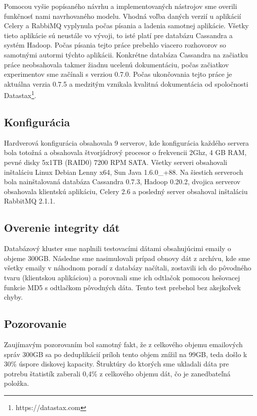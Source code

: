 \documentclass[11pt,twoside,a4paper]{book}
\begin{document}
Pomocou vyšie popísaného návrhu a implementovaných nástrojov sme overili funkčnosť nami navrhovaného modelu. Vhodná voľba daných verzií u aplikácií Celery a RabbiMQ vyplynula počas písania a ladenia samotnej aplikácie. Všetky tieto aplikácie sú neustále vo vývoji, to isté platí pre databázu Cassandra a systém Hadoop. Počas písania tejto práce prebehlo viacero rozhovorov so samotnými autormi týchto aplikácii. Konkrétne databáza Cassandra na začiatku práce neobsahovala takmer žiadnu ucelenú dokumentáciu, počas začiatkov experimentov sme začínali s verziou 0.7.0. Počas ukončovania tejto práce je aktuálna verzia 0.7.5 a medzitým vznikala kvalitná dokumentácia od spoločnosti Datastax\footnote{https://datastax.com}. 

\subsection*{Konfigurácia}
Hardverová konfigurácia obsahovala 9 serverov, kde konfigurácia každého servera bola totožná a obsahovala štvorjádrový procesor o frekvencii 2Ghz, 4 GB RAM, pevné disky 5x1TB (RAID0) 7200 RPM SATA. Všetky serveri obsahovali inštaláciu Linux Debian Lenny x64, Sun Java 1.6.0\_+88. Na šiestich serveroch bola nainštalovaná databáza Cassandra 0.7.3, Hadoop 0.20.2, dvojica serverov obsahovala klientskú aplikáciu, Celery 2.6 a posledný server obsahoval inštaláciu RabbitMQ 2.1.1. 

\subsection*{Overenie integrity dát}
Databázový kluster sme naplnili testovacími dátami obsahujúcimi emaily o objeme 300GB. Následne sme nasimulovali prípad obnovy dát z archívu, kde sme všetky emaily v náhodnom poradí z databázy načítali, zostavili ich do pôvodného tvaru (klientskou aplikáciou) a porovnali sme ich odtlačok pomocou hešovacej funkcie MD5 s odtlačkom pôvodných dáta. Tento test prebehol bez akejkoľvek chyby. 

\subsection*{Pozorovanie}
Zaujímavým pozorovaním bol samotný fakt, že z celkového objemu emailových správ 300GB sa po deduplikácií príloh tento objem znížil na 99GB, teda došlo k 30\% úspore diskovej kapacity. Štruktúry do ktorých sme ukladali dáta pre potrebu štatistík zaberali 0,4\% z celkového objemu dát, čo je zanedbateľná položka.
\end{document}
